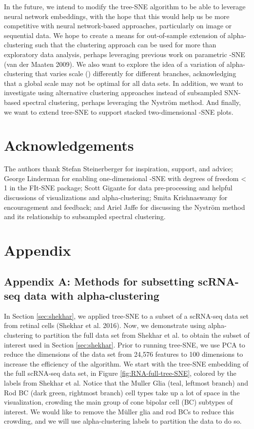 \documentclass{article}
\begin{document}
In the future, we intend to modify the tree-SNE algorithm to be able to leverage neural network embeddings, with the hope that this would help us be more competitive with neural network-based approaches, particularly on image or sequential data. We hope to create a means for out-of-sample extension of alpha-clustering such that the clustering approach can be used for more than exploratory data analysis, perhaps leveraging previous work on parametric -SNE (van der Maaten 2009). We also want to explore the idea of a variation of alpha-clustering that varies scale () differently for different branches, acknowledging that a global scale may not be optimal for all data sets. In addition, we want to investigate using alternative clustering approaches instead of subsampled SNN-based spectral clustering, perhaps leveraging the Nyström method. And finally, we want to extend tree-SNE to support stacked two-dimensional -SNE plots.

\section{Acknowledgements}

The authors thank Stefan Steinerberger for inspiration, support, and advice; George Linderman for enabling one-dimensional -SNE with degrees of freedom < 1 in the FIt-SNE package; Scott Gigante for data pre-processing and helpful discussions of visualizations and alpha-clustering; Smita Krishnaswamy for encouragement and feedback; and Ariel Jaffe for discussing the Nyström method and its relationship to subsampled spectral clustering.

\section{Appendix}

\subsection{Appendix A: Methods for subsetting scRNA-seq data with alpha-clustering} \label{sec:shekhar-appendix}

In Section \ref{sec:shekhar}, we applied tree-SNE to a subset of a scRNA-seq data set from retinal cells (Shekhar et al. 2016). Now, we demonstrate using alpha-clustering to partition the full data set from Shekhar et al. to obtain the subset of interest used in Section \ref{sec:shekhar}. Prior to running tree-SNE, we use PCA to reduce the dimensions of the data set from 24,576 features to 100 dimensions to increase the efficiency of the algorithm. We start with the tree-SNE embedding of the full scRNA-seq data set, in Figure \ref{fig:RNA-full-tree-SNE}, colored by the labels from Shekhar et al. Notice that the Muller Glia (teal, leftmost branch) and Rod BC (dark green, rightmost branch) cell types take up a lot of space in the visualization, crowding the main group of cone bipolar cell (BC) subtypes of interest. We would like to remove the Müller glia and rod BCs to reduce this crowding, and we will use alpha-clustering labels to partition the data to do so. 
\end{document}
